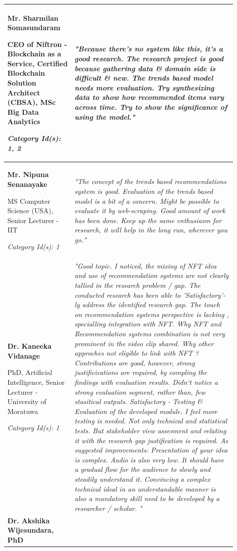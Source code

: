 \begin{longtable}{|p{0.27\linewidth}|p{0.655\linewidth}|}
\hline
\textbf{Mr. Sharmilan Somasundaram}

CEO of Niftron - Blockchain as a Service, Certified Blockchain Solution Architect (CBSA), MSc Big Data Analytics

\textit{Category Id(s): 1, 2}
&  
\textit{"Because there's no system like this, it's a good research. The research project is good because gathering data \& domain side is difficult \& new.
The trends based model needs more evaluation. Try synthesizing data to show how recommended items vary across time. Try to show the significance of using the model."}
\\
\hline
\textbf{Mr. Nipuna Senanayake} 

MS Computer Science (USA), Senior Lecturer - IIT

\textit{Category Id(s): 1}
& 
\textit{"The concept of the trends based recommendations system is good. Evaluation of the trends based model is a bit of a concern. Might be possible to evaluate it by web-scraping.
Good amount of work has been done. Keep up the same enthusiasm for research, it will help in the long run, wherever you go."}
 \\
\hline
\textbf{Dr. Kaneeka Vidanage}

PhD, Artificial Intelligence, Senior Lecturer - University of Moratuwa

\textit{Category Id(s): 1}
& 
\textit{"Good topic. I noticed, the mixing of NFT idea and use of recommendation systems are not clearly tallied in the research problem / gap.
The conducted research has been able to 'Satisfactory'-ly address the identified research gap. The touch on recommendation systems perspective is lacking , specialling integration with NFT.
Why NFT and Recommendation systems combination is not very prominent in the video clip shared. Why other approches not eligible to link with NFT ?
Contributions are good, however, strong justificications are required, by compling the findings with evaluation results. Didn`t notice a strong evaluation segment, rather than, few stasitical outputs.
Satisfactory - Testing \& Evaluation of the developed module. I feel more testing is needed. Not only technical and statistical tests. But stakeholder view assesment and relating it with the research gap justification is required.
As suggested improvements: Presentation of your idea is complex. Audio is also very low.  It should have a gradual flow for the audience to slowly and steadily understand it. Convincing a complex technical ideal in an understandable manner is also a mandatory skill need to be developed by a researcher / scholar. 
"}
\\
\hline
\textbf{Dr. Akshika Wijesundara, PhD}


\end{longtable}
